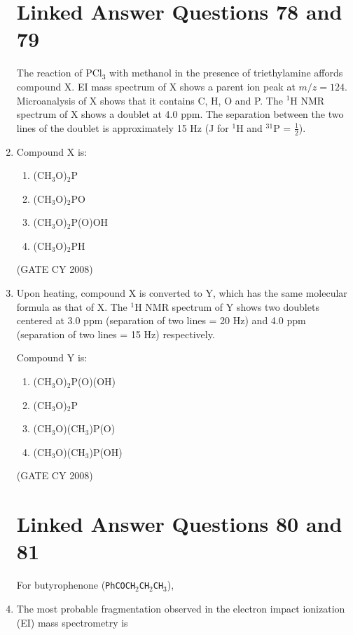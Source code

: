 \documentclass[12pt]{article}
\begin{document}
\begin{enumerate}
\section*{Linked Answer Questions 78 and 79}

The reaction of PCl$_3$ with methanol in the presence of triethylamine affords compound X. EI mass spectrum of X shows a parent ion peak at $m/z = 124$. Microanalysis of X shows that it contains C, H, O and P. The $^1$H NMR spectrum of X shows a doublet at 4.0 ppm. The separation between the two lines of the doublet is approximately 15 Hz (J for $^1$H and $^{31}$P = $\tfrac{1}{2}$).


    \item Compound X is:
    \begin{enumerate}
        \item (CH$_3$O)$_2$P
        \item (CH$_3$O)$_2$PO
        \item (CH$_3$O)$_2$P(O)OH
        \item (CH$_3$O)$_2$PH
    \end{enumerate}    \hfill{(GATE CY 2008)}


    \item Upon heating, compound X is converted to Y, which has the same molecular formula as that of X. The $^1$H NMR spectrum of Y shows two doublets centered at 3.0 ppm (separation of two lines = 20 Hz) and 4.0 ppm (separation of two lines = 15 Hz) respectively.

    Compound Y is:
    \begin{enumerate}
        \item (CH$_3$O)$_2$P(O)(OH)
        \item (CH$_3$O)$_2$P
        \item (CH$_3$O)(CH$_3$)P(O)
        \item (CH$_3$O)(CH$_3$)P(OH)
    \end{enumerate}
   \hfill{(GATE CY 2008)}


\section*{Linked Answer Questions 80 and 81}

For butyrophenone (\texttt{PhCOCH\(_2\)CH\(_2\)CH\(_3\)}),

\item  The most probable fragmentation observed in the electron impact ionization (EI) mass spectrometry is


\end{enumerate}
\end{document}
